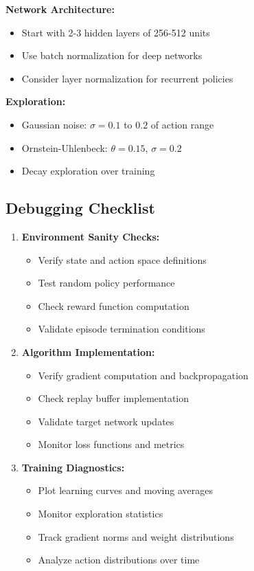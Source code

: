 \textbf{Network Architecture:}
\begin{itemize}
    \item Start with 2-3 hidden layers of 256-512 units
    \item Use batch normalization for deep networks
    \item Consider layer normalization for recurrent policies
\end{itemize}

\textbf{Exploration:}
\begin{itemize}
    \item Gaussian noise: $\sigma = 0.1$ to $0.2$ of action range
    \item Ornstein-Uhlenbeck: $\theta = 0.15$, $\sigma = 0.2$
    \item Decay exploration over training
\end{itemize}

\subsection{Debugging Checklist}

\begin{enumerate}
    \item \textbf{Environment Sanity Checks:}
    \begin{itemize}
        \item Verify state and action space definitions
        \item Test random policy performance
        \item Check reward function computation
        \item Validate episode termination conditions
    \end{itemize}
    
    \item \textbf{Algorithm Implementation:}
    \begin{itemize}
        \item Verify gradient computation and backpropagation
        \item Check replay buffer implementation
        \item Validate target network updates
        \item Monitor loss functions and metrics
    \end{itemize}
    
    \item \textbf{Training Diagnostics:}
    \begin{itemize}
        \item Plot learning curves and moving averages
        \item Monitor exploration statistics
        \item Track gradient norms and weight distributions
        \item Analyze action distributions over time
    \end{itemize}
\end{enumerate}